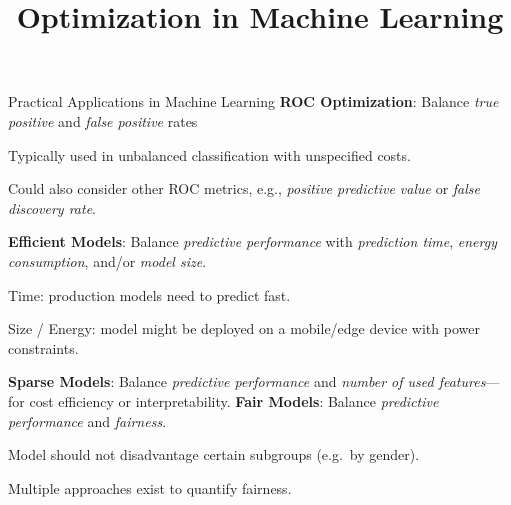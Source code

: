 \documentclass[11pt,compress,t,notes=noshow,xcolor=table]{beamer}
\title{Optimization in Machine Learning}
\begin{document}

\begin{framev}[fs=small]{Practical Applications in Machine Learning}
\textbf{ROC Optimization}: Balance \emph{true positive} and \emph{false positive} rates
\begin{itemizeM}
\item Typically used in unbalanced classification with unspecified costs.
\item Could also consider other ROC metrics, e.g., \emph{positive predictive value} or \emph{false discovery rate}.
\end{itemizeM}
\textbf{Efficient Models}:
Balance \emph{predictive performance} with \emph{prediction time}, \emph{energy consumption}, and/or \emph{model size}.
\begin{itemizeM}
\item Time: production models need to predict fast.
\item Size / Energy: model might be deployed on a mobile/edge device with power constraints.
\end{itemizeM}
\textbf{Sparse Models}:
Balance \emph{predictive performance} and \emph{number of used features}---for cost efficiency or interpretability.
\textbf{Fair Models}:
Balance \emph{predictive performance} and \emph{fairness}.
\begin{itemizeM}
\item Model should not disadvantage certain subgroups (e.g.\ by gender).
\item Multiple approaches exist to quantify fairness.
\end{itemizeM}
\end{framev}
\end{document}
